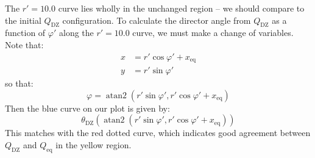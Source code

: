 \documentclass[reqno]{article}
\newcommand{\thetadz}{\theta_\text{DZ}}
\newcommand{\Qdz}{Q_\text{DZ}}
\newcommand{\Qeq}{Q_\text{eq}}
\newcommand{\xeq}{x_\text{eq}}
\DeclareMathOperator{\atantwo}{atan2}
\begin{document}
The $r' = 10.0$ curve lies wholly in the unchanged region -- we should compare to the initial $\Qdz$ configuration. 
To calculate the director angle from $\Qdz$ as a function of $\varphi'$ along the $r' = 10.0$ curve, we must make a change of variables. 
Note that:
\begin{align}
    x &= r' \cos \varphi' + \xeq \\
    y &= r' \sin \varphi'
\end{align}
so that:
\begin{equation}
    \varphi 
    = 
    \atantwo(r'\sin\varphi', r'\cos\varphi' + \xeq)
\end{equation}
Then the blue curve on our plot is given by:
\begin{equation}
    \thetadz(\atantwo(r'\sin\varphi', r'\cos\varphi' + \xeq))
\end{equation}
This matches with the red dotted curve, which indicates good agreement between $\Qdz$ and $\Qeq$ in the yellow region.
\end{document}

